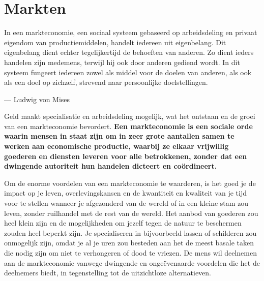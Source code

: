 \hypertarget{markten}{%
\chapter{Markten}\label{markten}}

\vspace{-2em}
\begin{blockquotebox}
    In een markteconomie, een sociaal systeem gebaseerd op arbeidsdeling en privaat eigendom van productiemiddelen, handelt iedereen uit eigenbelang. Dit eigenbelang dient echter tegelijkertijd de behoeften van anderen. Zo dient ieders handelen zijn medemens, terwijl hij ook door anderen gediend wordt. In dit systeem fungeert iedereen zowel als middel voor de doelen van anderen, als ook als een doel op zichzelf, strevend naar persoonlijke doelstellingen.
\footnotemark
    \par\raggedleft--- Ludwig von Mises
\end{blockquotebox}
\autocite{123}

Geld maakt specialisatie en arbeidsdeling mogelijk, wat het ontstaan en de groei van een markteconomie bevordert. \textbf{Een markteconomie is een sociale orde waarin mensen in staat zijn om in zeer grote aantallen samen te werken aan economische productie, waarbij ze elkaar vrijwillig goederen en diensten leveren voor alle betrokkenen, zonder dat een dwingende autoriteit hun handelen dicteert en coördineert.}

Om de enorme voordelen van een markteconomie te waarderen, is het goed je de impact op je leven, overlevingskansen en de kwantiteit en kwaliteit van je tijd voor te stellen wanneer je afgezonderd van de wereld of in een kleine stam zou leven, zonder ruilhandel met de rest van de wereld. Het aanbod van goederen zou heel klein zijn en de mogelijkheden om jezelf tegen de natuur te beschermen zouden heel beperkt zijn. Je specialiseren in bijvoorbeeld lassen of schilderen zou onmogelijk zijn, omdat je al je uren zou besteden aan het de meest basale taken die nodig zijn om niet te verhongeren of dood te vriezen. De mens wil deelnemen aan de markteconomie vanwege dwingende en ongeëvenaarde voordelen die het de deelnemers biedt, in tegenstelling tot de uitzichtloze alternatieven.

